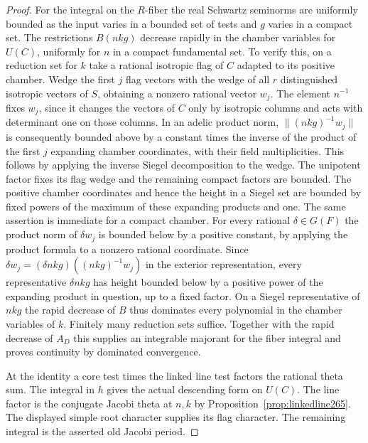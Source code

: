 \documentclass[a4paper,11pt]{article}
\theoremstyle{definition}
\theoremstyle{remark}
\numberwithin{equation}{section}
\begin{document}
\begin{proof}
For the integral on the \(R\)-fiber the real Schwartz
seminorms are uniformly bounded as the input varies in a
bounded set of tests and \(g\) varies in a compact set.
The restrictions \(B(nk g)\) decrease rapidly in the chamber
variables for \(U(C)\), uniformly for \(n\) in a compact
fundamental set. To verify this, on a reduction set for \(k\)
take a rational isotropic flag of \(C\) adapted to its
positive chamber. Wedge the first \(j\) flag vectors with
the wedge of all \(r\) distinguished isotropic vectors of \(S\),
obtaining a nonzero rational vector \(w_j\).
The element \(n^{-1}\) fixes \(w_j\), since it changes the
vectors of \(C\) only by isotropic columns and acts with
determinant one on those columns. In an adelic product norm,
\(\|(nk g)^{-1}w_j\|\) is consequently bounded above by a
constant times the inverse of the product of the first \(j\)
expanding chamber coordinates, with their field multiplicities.
This follows by applying the inverse Siegel decomposition to
the wedge. The unipotent factor fixes its flag wedge and the
remaining compact factors are bounded. The positive chamber
coordinates and hence the height in a Siegel set are bounded by
fixed powers of the maximum of these expanding products and one.
The same assertion is immediate for a compact chamber.
For every rational \(\delta\in G(F)\) the product norm of
\(\delta w_j\) is bounded below by a positive constant, by
applying the product formula to a nonzero rational coordinate.
Since \(\delta w_j=(\delta nk g)((nk g)^{-1}w_j)\) in the
exterior representation, every representative \(\delta nk g\)
has height bounded below by a positive power of the expanding
product in question, up to a fixed factor. On a Siegel
representative of \(nk g\) the rapid decrease of \(B\) thus
dominates every polynomial in the chamber variables of \(k\).
Finitely many reduction sets suffice. Together with the
rapid decrease of \(A_D\) this supplies an integrable
majorant for the fiber integral and proves continuity by
dominated convergence.

At the identity a core test times the linked line test
factors the rational theta sum. The integral in \(h\) gives
the actual descending form on \(U(C)\). The line factor is
the conjugate Jacobi theta at \(n,k\) by
Proposition~\ref{prop:linkedline265}. The displayed simple
root character supplies its flag character. The remaining
integral is the asserted old Jacobi period.
\end{proof}
\end{document}
